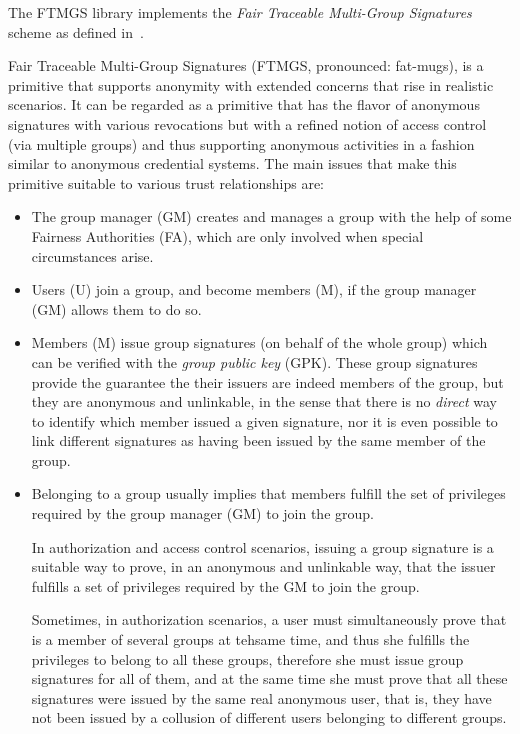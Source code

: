 \documentclass[a4paper]{article}
\begin{document}
The FTMGS library implements the \emph{Fair Traceable Multi-Group
  Signatures} scheme as defined in~\cite{bcly:2008:ftmgs}.

Fair Traceable Multi-Group Signatures (FTMGS, pronounced: fat-mugs),
is a primitive that supports anonymity with extended concerns that
rise in realistic scenarios. It can be regarded as a primitive that
has the flavor of anonymous signatures with various revocations but
with a refined notion of access control (via multiple groups) and thus
supporting anonymous activities in a fashion similar to anonymous
credential systems. The main issues that make this primitive suitable
to various trust relationships are:

\begin{itemize}%
\item 
The group manager (GM) creates and manages a group with the help of
some Fairness Authorities (FA), which are only involved when special
circumstances arise.

\item 
Users (U) join a group, and become members (M), if the group manager
(GM) allows them to do so.

\item 
Members (M) issue group signatures (on behalf of the whole group)
which can be verified with the \emph{group public key} (GPK). These
group signatures provide the guarantee the their issuers are indeed
members of the group, but they are anonymous and unlinkable, in the
sense that there is no \emph{direct} way to identify which member
issued a given signature, nor it is even possible to link different
signatures as having been issued by the same member of the group.

\item
Belonging to a group usually implies that members fulfill the set of
privileges required by the group manager (GM) to join the group.

In authorization and access control scenarios, issuing a group
signature is a suitable way to prove, in an anonymous and unlinkable
way, that the issuer fulfills a set of privileges required by the GM
to join the group.

Sometimes, in authorization scenarios, a user must simultaneously
prove that is a member of several groups at tehsame time, and thus she
fulfills the privileges to belong to all these groups, therefore she
must issue group signatures for all of them, and at the same time she
must prove that all these signatures were issued by the same real
anonymous user, that is, they have not been issued by a collusion of
different users belonging to different groups.


\end{itemize}
\end{document}
